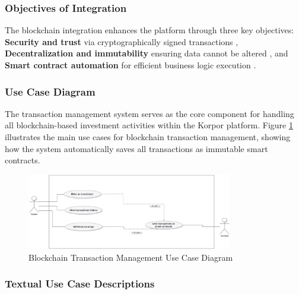 \subsubsection{Objectives of Integration}

The blockchain integration enhances the platform through three key objectives: \textbf{Security and trust} via cryptographically signed transactions \cite{Zheng2018BlockchainChallenges}, \textbf{Decentralization and immutability} ensuring data cannot be altered \cite{Antonopoulos2018MasteringEthereum}, and \textbf{Smart contract automation} for efficient business logic execution \cite{Bartoletti2017EmpiricalAnalysis}.

\subsubsection{Use Case Diagram}

The transaction management  system serves as the core component for handling all blockchain-based investment activities within the Korpor platform. Figure \ref{fig:transaction-use-case} illustrates the main use cases for blockchain transaction management, showing how the system automatically saves all transactions as immutable smart contracts.

\begin{figure}[htbp]
    \centering
    \includegraphics[width=0.8\textwidth]{images/transaction_use_case_diagram.png}
    \caption{Blockchain Transaction Management Use Case Diagram}
    \label{fig:transaction-use-case}
\end{figure}
\subsubsection{Textual Use Case Descriptions}

